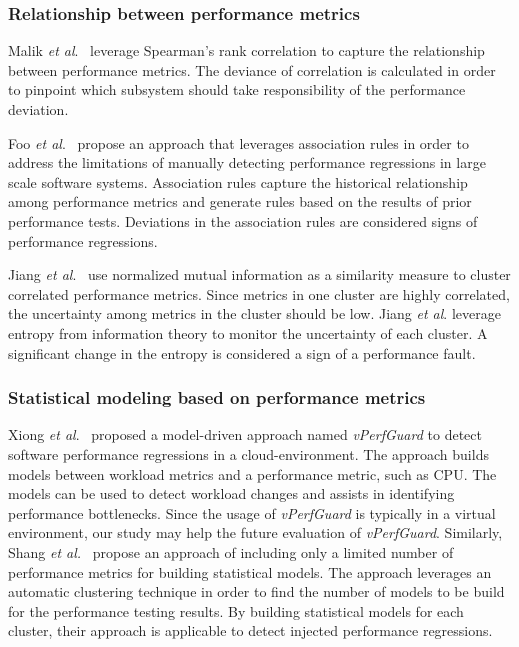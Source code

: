 \subsubsection{Relationship between performance metrics}
\label{sec:relatedrelation}

Malik \emph{et al$.$}~\cite{5635038} leverage Spearman's rank correlation to capture the relationship between performance metrics. The deviance of correlation is calculated in order to pinpoint which subsystem should take responsibility of the performance deviation.

Foo \emph{ et al$.$}~\cite{foo2010mining} propose an approach that leverages association rules in order to address the limitations of manually detecting performance regressions in large scale software systems. Association rules capture the historical relationship among performance metrics and generate rules based on the results of prior performance tests. Deviations in the association rules are considered signs of performance regressions.

Jiang \emph{et al$.$}~\cite{5270324} use normalized mutual information as a similarity measure to cluster correlated performance metrics. Since metrics in one cluster are highly correlated, the uncertainty among metrics in the cluster should be low. Jiang \emph{et al$.$} leverage entropy from information theory to monitor the uncertainty of each cluster. A significant change in the entropy is considered a sign of a performance fault. 


\subsubsection{Statistical modeling based on performance metrics}
\label{sec:relatedmodel}

Xiong \textit{et al$.$}~\cite{xiong2013vperfguard} proposed a model-driven approach named \textit{vPerfGuard} to detect software performance regressions in a cloud-environment. The approach builds models between workload metrics and a performance metric, such as CPU. The models can be used to detect workload changes and assists in identifying performance bottlenecks. Since the usage of \emph{vPerfGuard} is typically in a virtual environment, our study may help the future evaluation of \textit{vPerfGuard}. Similarly, Shang \textit{ et al.}~\cite{Shang:2015:ADP:2668930.2688052} propose an approach of including only a limited number of performance metrics for building statistical models. The approach leverages an automatic clustering technique in order to find the number of models to be build for the performance testing results. By building statistical models for each cluster, their approach is applicable to detect injected performance regressions. 

